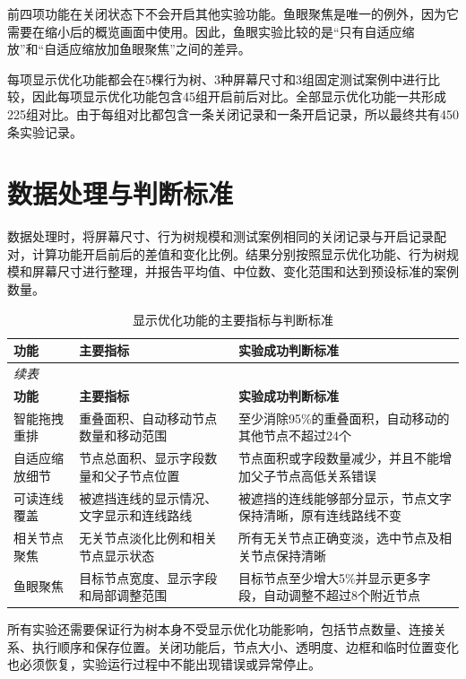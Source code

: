 \documentclass[11pt,a4paper,oneside,extrafontsizes]{memoir}
\begin{document}
前四项功能在关闭状态下不会开启其他实验功能。鱼眼聚焦是唯一的例外，因为它需要在缩小后的概览画面中使用。因此，鱼眼实验比较的是“只有自适应缩放”和“自适应缩放加鱼眼聚焦”之间的差异。

每项显示优化功能都会在5棵行为树、3种屏幕尺寸和3组固定测试案例中进行比较，因此每项显示优化功能包含45组开启前后对比。全部显示优化功能一共形成225组对比。由于每组对比都包含一条关闭记录和一条开启记录，所以最终共有450条实验记录。

\section{数据处理与判断标准}

数据处理时，将屏幕尺寸、行为树规模和测试案例相同的关闭记录与开启记录配对，计算功能开启前后的差值和变化比例。结果分别按照显示优化功能、行为树规模和屏幕尺寸进行整理，并报告平均值、中位数、变化范围和达到预设标准的案例数量。


\begin{center}

\begin{longtable}{@{}p{} p{} p{}@{}}
\caption{显示优化功能的主要指标与判断标准}\label{tab:display-metrics-criteria}\\
\toprule
\textbf{功能} & \textbf{主要指标} & \textbf{实验成功判断标准} \\
\midrule
\endfirsthead
\multicolumn{3}{l}{\itshape 续表}\\
\toprule
\textbf{功能} & \textbf{主要指标} & \textbf{实验成功判断标准} \\
\midrule
\endhead
智能拖拽重排 & 重叠面积、自动移动节点数量和移动范围 & 至少消除95\%的重叠面积，自动移动的其他节点不超过24个 \\
自适应缩放细节 & 节点总面积、显示字段数量和父子节点位置 & 节点面积或字段数量减少，并且不能增加父子节点高低关系错误 \\
可读连线覆盖 & 被遮挡连线的显示情况、文字显示和连线路线 & 被遮挡的连线能够部分显示，节点文字保持清晰，原有连线路线不变 \\
相关节点聚焦 & 无关节点淡化比例和相关节点显示状态 & 所有无关节点正确变淡，选中节点及相关节点保持清晰 \\
鱼眼聚焦 & 目标节点宽度、显示字段和局部调整范围 & 目标节点至少增大5\%并显示更多字段，自动调整不超过8个附近节点 \\
\bottomrule
\end{longtable}
\end{center}

所有实验还需要保证行为树本身不受显示优化功能影响，包括节点数量、连接关系、执行顺序和保存位置。关闭功能后，节点大小、透明度、边框和临时位置变化也必须恢复，实验运行过程中不能出现错误或异常停止。
\end{document}
